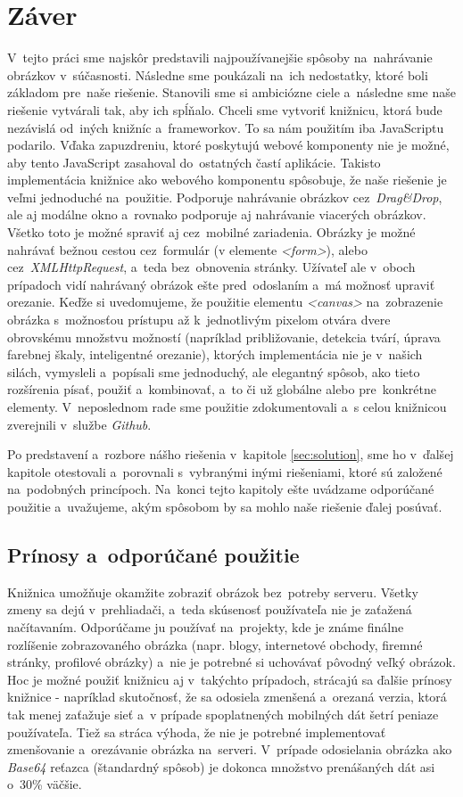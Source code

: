 \chapter{Záver}
V~tejto práci sme najskôr predstavili najpoužívanejšie spôsoby na~nahrávanie obrázkov v~súčasnosti. Následne sme poukázali na~ich nedostatky, ktoré boli základom pre~naše riešenie. Stanovili sme si ambiciózne ciele a~následne sme naše riešenie vytvárali tak, aby ich spĺňalo.
Chceli sme vytvoriť knižnicu, ktorá bude nezávislá od~iných knižníc a~frameworkov. To sa nám použitím iba JavaScriptu podarilo. Vďaka zapuzdreniu, ktoré poskytujú webové komponenty nie je možné, aby tento JavaScript zasahoval do~ostatných častí aplikácie. Takisto implementácia knižnice ako webového  komponentu spôsobuje, že naše riešenie je veľmi jednoduché na~použitie.
Podporuje nahrávanie obrázkov cez~\emph{Drag\&Drop}, ale aj modálne okno a~rovnako podporuje aj nahrávanie viacerých obrázkov. Všetko toto je možné spraviť aj cez~mobilné zariadenia. Obrázky je možné nahrávať bežnou cestou cez~formulár (v elemente \emph{<form>}), alebo cez~\emph{XMLHttpRequest}, a~teda bez~obnovenia stránky. Užívateľ ale v~oboch prípadoch vidí nahrávaný obrázok ešte pred~odoslaním a~má možnosť upraviť orezanie.
Keďže si uvedomujeme, že použitie elementu \emph{<canvas>} na~zobrazenie obrázka s~možnosťou prístupu až k~jednotlivým pixelom otvára dvere obrovskému množstvu možností (napríklad približovanie, detekcia tvárí, úprava farebnej škaly, inteligentné orezanie), ktorých implementácia nie je v~našich silách, vymysleli a~popísali sme jednoduchý, ale elegantný spôsob, ako tieto rozšírenia písať, použiť a~kombinovať, a~to či už globálne alebo pre~konkrétne elementy. V~neposlednom rade sme použitie zdokumentovali a~s celou knižnicou zverejnili v~službe \emph{Github}.

Po predstavení a~rozbore nášho riešenia v~kapitole \ref{sec:solution}, sme ho v~ďalšej kapitole otestovali a~porovnali s~vybranými inými riešeniami, ktoré sú založené na~podobných princípoch. Na~konci tejto kapitoly ešte uvádzame odporúčané použitie a~uvažujeme, akým spôsobom by sa mohlo naše riešenie ďalej posúvať. 


\section{Prínosy a~odporúčané použitie}

Knižnica umožňuje okamžite zobraziť obrázok bez~potreby serveru. Všetky zmeny sa dejú v~prehliadači, a~teda skúsenosť používateľa nie je zaťažená načítavaním. Odporúčame ju používať na~projekty, kde je známe finálne rozlíšenie zobrazovaného obrázka (napr. blogy, internetové obchody, firemné stránky, profilové obrázky) a~nie je potrebné si uchovávať pôvodný veľký obrázok. Hoc je možné použiť knižnicu aj v~takýchto prípadoch, strácajú sa ďalšie prínosy knižnice - napríklad skutočnosť, že sa odosiela zmenšená a~orezaná verzia, ktorá tak menej zaťažuje sieť a~v prípade spoplatnených mobilných dát šetrí peniaze používateľa. Tiež sa stráca výhoda, že nie je potrebné implementovať zmenšovanie a~orezávanie obrázka na~serveri. V~prípade odosielania obrázka ako \emph{Base64} reťazca (štandardný spôsob) je dokonca množstvo prenášaných dát asi o~30\% väčšie.


